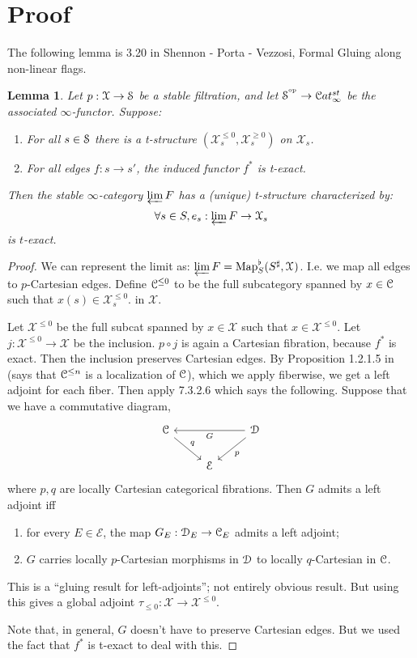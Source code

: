 \documentclass[10pt,a4paper,reqno,oneside]{book} %
\theoremstyle{plain}
\newtheorem{lem}[thm]{Lemma}
\theoremstyle{definition}
\theoremstyle{remark}
\numberwithin{equation}{section}
\begin{document}
\section{Proof}
\label{sect:descent_proof}
The following lemma is 3.20 in Shennon - Porta - Vezzosi, Formal Gluing along non-linear
flags. 

\begin{lem}
\label{lem:t_filt}
Let $p : \mathcal{X} \to \mathcal S$ be a stable filtration, and let $\mathcal S^{^\mathrm{op}} \to \mathcal C at_{\infty}^{st}$ be the associated 
$\infty$-functor. Suppose:
\begin{enumerate}
\item For all $s \in \mathcal S$ there is a t-structure $(\mathcal{X}_s^{\leq 0}, \mathcal{X}_s^{\geq 0})$ on $\mathcal{X}_s$.
\item For all edges $f:s \to s'$, the induced functor $f^*$ is t-exact.
\end{enumerate}
Then the stable $\infty$-category $\varprojlim F$ has a (unique) t-structure characterized by:
\[	\forall s \in S, e_s : \varprojlim F \to \mathcal{X}_s 	\]
is $t$-exact.
\end{lem}
\begin{proof}
We can represent the limit as: $\varprojlim F = \operatorname{Map}^{\flat}_S(S^{\sharp},\mathcal{X}^{} )$. 
I.e. we map all edges to $p$-Cartesian edges. Define $\mathcal C^{\leq 0}$ to be the full subcategory spanned by $x \in \mathcal C$ such that
$x(s) \in \mathcal{X}_s^{\leq 0}$.
in $\mathcal{X}$.

Let $\mathcal{X}^{\leq 0}$ be the full subcat spanned by $x \in \mathcal{X}$ such that $x \in \mathcal{X}^{\leq 0}_{}$. Let
$j: \mathcal{X}^{\leq 0} \to \mathcal{X}$ be the inclusion.
$p\circ j$ is again a Cartesian fibration, because $f^*$ is exact. Then the inclusion preserves Cartesian edges.
By Proposition 1.2.1.5 in \cite{Lurie_Higher_algebra} (says that $\mathcal C^{\leq n}$ is a localization of $\mathcal C$), which we apply
fiberwise, we get a left adjoint for each fiber. Then apply \cite{Lurie_Higher_algebra} 7.3.2.6 which says the
following. Suppose that we have
a commutative diagram,
\[
\begin{tikzcd}
\cC\arrow{dr}{q} & & \cD\arrow{ll}{G} \arrow{dl}{p} \\
 & \cE & 
\end{tikzcd}
\]
where $p, q$ are locally Cartesian categorical fibrations. Then $G$ admits a left adjoint iff
\begin{enumerate}
\item for every $E \in \mathcal{E}$, the map $G_E : \mathcal D_E \to \mathcal C_E$ admits a left adjoint;
\item $G$ carries locally $p$-Cartesian morphisms in $\mathcal D$ to locally $q$-Cartesian in $\mathcal C$.
\end{enumerate}
This is a ``gluing result for left-adjoints''; not entirely obvious result. But using this gives a global adjoint
$\tau_{\leq 0} : \mathcal{X} \to \mathcal{X}^{\leq 0}$.

Note that, in general, $G$ doesn't have
to preserve Cartesian edges. But we used the fact that $f^*$ is t-exact to deal with this.
\end{proof}
\end{document}
